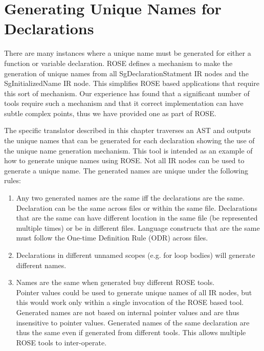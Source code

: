 \chapter{Generating Unique Names for Declarations}

     There are many instances where a unique name must be generated for
either a function or variable declaration.  ROSE defines a mechanism
to make the generation of unique names from all SgDeclarationStatment
IR nodes and the SgInitializedName IR node.  This simplifies ROSE based
applications that require this sort of mechanism.  Our experience has found
that a significant number of tools require such a mechanism and that it
correct implementation can have subtle complex points, thus we have provided
one as part of ROSE.

     The specific translator described in this chapter traverses an AST and outputs the
unique names that can be generated for each declaration showing the use of the 
unique name generation mechanism.  This tool is intended as an example of how to 
generate unique names using ROSE. Not all IR nodes can be used to generate a unique
name. The generated names are unique under the following rules:
\begin{enumerate}
   \item Any two generated names are the same iff the declarations are the same. \\
   Declaration can be the same across files or within the same file.  Declarations that
   are the same can have different location in the same file (be represented multiple
   times) or be in different files. Language constructs that are the same must follow 
   the One-time Definition Rule (ODR) across files.
   \item Declarations in different unnamed scopes (e.g. for loop bodies) will generate 
   different names.
   \item Names are the same when generated buy different ROSE tools. \\
   Pointer values could be used to generate unique names of all IR nodes, but this would
   work only within a single invocation of the ROSE based tool.  Generated names are 
   not based on internal pointer values and are thus insensitive to pointer values.
   Generated names of the same declaration are thus the same even if generated from
   different tools.  This allows multiple ROSE tools to inter-operate.
\end{enumerate}

